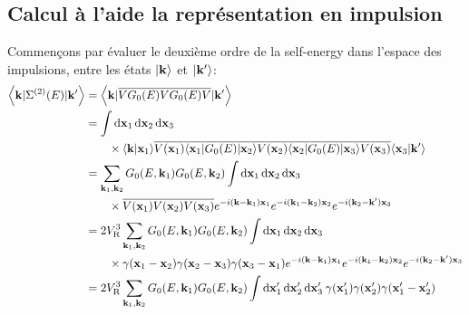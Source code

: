 \subsection{Calcul à l'aide la représentation en impulsion}
Commençons par évaluer le deuxième ordre de la self-energy dans l'espace des impulsions, entre les états $\left| \mathbf{k} \right\rangle$ et $\left| \mathbf{k}' \right\rangle$:
\begin{align}
\left\langle \mathbf{k} | \Sigma^{(2)}(E) | \mathbf{k}' \right\rangle &= \left\langle \mathbf{k} | \overline{V G_0(E) V G_0(E) V} | \mathbf{k}' \right\rangle \\
&=\int{\diff\mathbf{x}_{\mathrm{1}}\diff\mathbf{x}_{\mathrm{2}}\diff\mathbf{x}_{\mathrm{3}}\:}  \\
&\nonumber\qquad\times \langle\mathbf{k}|\mathbf{x}_{\mathrm{1}}\rangle \overline{V(\mathbf{x}_{\mathrm{1}}) \langle\mathbf{x}_{\mathrm{1}}|G_0(E)|\mathbf{x}_{\mathrm{2}}\rangle V(\mathbf{x}_{\mathrm{2}}) \langle\mathbf{x}_{\mathrm{2}}|G_0(E)|\mathbf{x}_{\mathrm{3}}\rangle V(\mathbf{x}_{\mathrm{3}})} \langle\mathbf{x}_{\mathrm{3}}|\mathbf{k}'\rangle \\
&= \sum_{\mathbf{k}_{\mathrm{1}},\mathbf{k}_{\mathrm{2}}}{ G_0(E,\mathbf{k}_{\mathrm{1}}) G_0(E,\mathbf{k}_{\mathrm{2}})} \int{\diff\mathbf{x}_{\mathrm{1}} \diff\mathbf{x}_{\mathrm{2}} \diff\mathbf{x}_{\mathrm{3}}} \\
&\nonumber\qquad\times \overline{V(\mathbf{x}_{\mathrm{1}})V(\mathbf{x}_{\mathrm{2}})V(\mathbf{x}_{\mathrm{3}})} e^{-i(\mathbf{k}-\mathbf{k}_{\mathrm{1}})\mathbf{x}_{\mathrm{1}}} e^{-i(\mathbf{k}_{\mathrm{1}}-\mathbf{k}_{\mathrm{2}})\mathbf{x}_{\mathrm{2}}} e^{-i(\mathbf{k}_{\mathrm{2}}-\mathbf{k}')\mathbf{x}_{\mathrm{3}}} \\
&=2 \VR^3 \sum_{\mathbf{k}_{\mathrm{1}},\mathbf{k}_{\mathrm{2}}}{ G_0(E,\mathbf{k}_{\mathrm{1}}) G_0(E,\mathbf{k}_{\mathrm{2}})} \int{\diff\mathbf{x}_{\mathrm{1}} \diff\mathbf{x}_{\mathrm{2}} \diff\mathbf{x}_{\mathrm{3}}} \\
&\nonumber\qquad\times \gamma(\mathbf{x}_{\mathrm{1}}-\mathbf{x}_{\mathrm{2}})\gamma(\mathbf{x}_{\mathrm{2}}-\mathbf{x}_{\mathrm{3}})\gamma(\mathbf{x}_{\mathrm{3}}-\mathbf{x}_{\mathrm{1}}) e^{-i(\mathbf{k}-\mathbf{k}_{\mathrm{1}})\mathbf{x}_{\mathrm{1}}} e^{-i(\mathbf{k}_{\mathrm{1}}-\mathbf{k}_{\mathrm{2}})\mathbf{x}_{\mathrm{2}}} e^{-i(\mathbf{k}_{\mathrm{2}}-\mathbf{k}')\mathbf{x}_{\mathrm{3}}} \\
&= 2 \VR^3 \sum_{\mathbf{k}_{\mathrm{1}},\mathbf{k}_{\mathrm{2}}}{G_0(E,\mathbf{k}_{\mathrm{1}}) G_0(E,\mathbf{k}_{\mathrm{2}})} \int{\diff\mathbf{x}_{\mathrm{1}}'\diff\mathbf{x}_{\mathrm{2}}'\diff\mathbf{x}_{\mathrm{3}}' \: \gamma(\mathbf{x}_{\mathrm{1}}')\gamma(\mathbf{x}_{\mathrm{2}}')\gamma(\mathbf{x}_{\mathrm{1}}'-\mathbf{x}_{\mathrm{2}}')}\\

\end{align}
